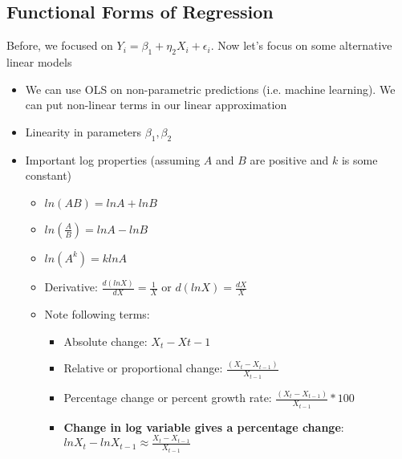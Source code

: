 \documentclass[10pt, oneside]{article}
\begin{document}
\subsection{Functional Forms of Regression}
Before, we focused on $Y_i = \beta_1 + \eta_2 X_i + \epsilon_i$. Now let's focus on some alternative linear models
\begin{itemize}
    \item We can use OLS on non-parametric predictions (i.e. machine learning). We can put non-linear terms in our linear approximation
    \item Linearity in parameters $\beta_1, \beta_2$
    \item Important log properties (assuming $A$ and $B$ are positive and $k$ is some constant)
    \begin{itemize}
        \item $ln(AB) = lnA + ln B$
        \item $ln(\frac{A}{B}) = lnA - ln B$
        \item $ln(A^k) = klnA$
        \item Derivative: $\frac{d(lnX)}{ dX} = \frac{1}{X}$ or $d(ln X) = \frac{dX}{X}$
        \item Note following terms:
        \begin{itemize}
            \item Absolute change: $X_t - X{t-1}$
            \item Relative or proportional change: $\frac{(X_t - X_{t-1})}{X_{t-1}}$
            \item Percentage change or percent growth rate: $\frac{(X_t - X_{t-1})}{X_{t-1}} * 100$
            \item \textbf{Change in log variable gives a percentage change}: $ln X_t - lnX_{t-1} \approx \frac{X_t - X_{t-1}}{X_{t-1}}$
        \end{itemize}
    \end{itemize}
\end{itemize}
\end{document}
